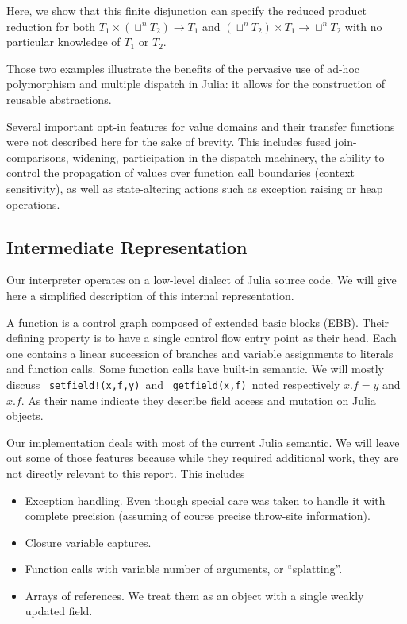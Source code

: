 \documentclass[11pt]{article}
\begin{document}
Here, we show that this finite disjunction can specify the reduced product reduction for both $T_1\times\left(\sqcup^nT_2\right)\to T_1$ and $\left(\sqcup^nT_2\right)\times T_1 \to \sqcup^nT_2$ with no particular knowledge of $T_1$ or $T_2$.

Those two examples illustrate the benefits of the pervasive use of ad-hoc polymorphism and multiple dispatch in Julia: it allows for the construction of reusable abstractions.

Several important opt-in features for value domains and their transfer functions were not described here for the sake of brevity. This includes fused join-comparisons, widening, participation in the dispatch machinery, the ability to control the propagation of values over function call boundaries (context sensitivity), as well as state-altering actions such as exception raising or heap operations.

\subsection*{Intermediate Representation}

Our interpreter operates on a low-level dialect of Julia source code.
We will give here a simplified description of this internal representation.

A function is a control graph composed of extended basic blocks (EBB). Their defining property is to have a single control flow entry point as their head. Each one contains a linear succession of branches and variable assignments to literals and function calls. Some function calls have built-in semantic. We will mostly discuss \ \verb~setfield!(x,f,y)~\  and \ \verb~getfield(x,f)~\  noted respectively $x.f=y$ and $x.f$.
As their name indicate they describe field access and mutation on Julia objects.

Our implementation deals with most of the current Julia semantic.
We will leave out some of those features because while they required additional work, they are not directly relevant to this report. This includes
\begin{itemize}
\item Exception handling. Even though special care was taken to handle it with complete precision (assuming of course precise throw-site information).
\item Closure variable captures.
\item Function calls with variable number of arguments, or ``splatting''.
\item Arrays of references. We treat them as an object with a single weakly updated field.
\end{itemize}
\end{document}
